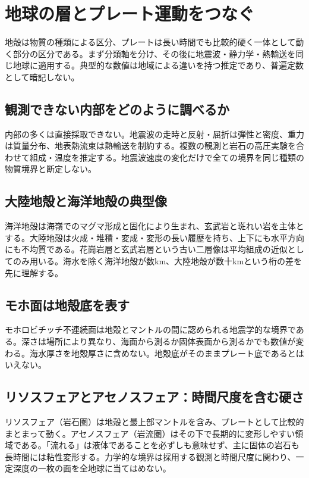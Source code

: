 \section{地球の層とプレート運動をつなぐ}
\label{theory:interior:overview}
地殻は物質の種類による区分、プレートは長い時間でも比較的硬く一体として動く部分の区分である。まず分類軸を分け、その後に地震波・静力学・熱輸送を同じ地球に適用する。典型的な数値は地域による違いを持つ推定であり、普遍定数として暗記しない。

\subsection{観測できない内部をどのように調べるか}
\label{theory:interior:observations}
内部の多くは直接採取できない。地震波の走時と反射・屈折は弾性と密度、重力は質量分布、地表熱流束は熱輸送を制約する。複数の観測と岩石の高圧実験を合わせて組成・温度を推定する。地震波速度の変化だけで全ての境界を同じ種類の物質境界と断定しない。\cite{usgs_interior_structure}

\subsection{大陸地殻と海洋地殻の典型像}
\label{theory:interior:crust}
海洋地殻は海嶺でのマグマ形成と固化により生まれ、玄武岩と斑れい岩を主体とする。大陸地殻は火成・堆積・変成・変形の長い履歴を持ち、上下にも水平方向にも不均質である。花崗岩層と玄武岩層という古い二層像は平均組成の近似としてのみ用いる。海水を除く海洋地殻が数km、大陸地殻が数十kmという桁の差を先に理解する。\cite{umich_crust_teaching,usgs_lithosphere2002}

\subsection{モホ面は地殻底を表す}
\label{theory:interior:moho}
モホロビチッチ不連続面は地殻とマントルの間に認められる地震学的な境界である。深さは場所により異なり、海面から測るか固体表面から測るかでも数値が変わる。海水厚さを地殻厚さに含めない。地殻底がそのままプレート底であるとはいえない。\cite{usgs_lithosphere2002}

\subsection{リソスフェアとアセノスフェア：時間尺度を含む硬さ}
\label{theory:interior:lithosphere}
リソスフェア（岩石圏）は地殻と最上部マントルを含み、プレートとして比較的まとまって動く。アセノスフェア（岩流圏）はその下で長期的に変形しやすい領域である。「流れる」は液体であることを必ずしも意味せず、主に固体の岩石も長時間には粘性変形する。力学的な境界は採用する観測と時間尺度に関わり、一定深度の一枚の面を全地球に当てはめない。\cite{kagoshima_plate2019}

